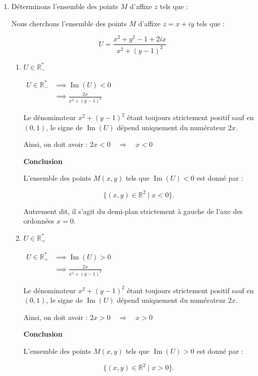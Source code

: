 \documentclass[12pt]{article}
\begin{document}
\begin{enumerate}
\item Déterminons l’ensemble des points $M$ d’affixe $z$ tels que :

Nous cherchons l’ensemble des points \( M \) d’affixe \( z = x + iy \) tels que :

\[
U = \frac{x^2 + y^2 - 1 + 2ix}{x^2 + (y-1)^2}
\]
    \begin{enumerate}
        \item $U \in \mathbb{R}^*_{-}$

$
\begin{aligned}
U \in \mathbb{R}^*_{-} &\implies  \operatorname{Im}(U) < 0\\
											 &\implies \frac{2x}{x^2 + (y-1)^2}
\end{aligned}
$

Le dénominateur \( x^2 + (y-1)^2 \) étant toujours strictement positif sauf en \( (0,1) \), le signe de \( \operatorname{Im}(U) \) dépend uniquement du numérateur \( 2x \).

Ainsi, on doit avoir : $2x < 0 \quad \Longrightarrow \quad x < 0$

\textbf{Conclusion}

L’ensemble des points \( M(x, y) \) tels que \( \operatorname{Im}(U) < 0 \) est donné par :

\[
\{ (x, y) \in \mathbb{R}^2 \mid x < 0 \}.
\]

Autrement dit, il s’agit du demi-plan strictement à gauche de l’axe des ordonnées \( x = 0 \).

        \item $U \in \mathbb{R}^*_{+}$
        
$
\begin{aligned}
U \in \mathbb{R}^*_{+} &\implies  \operatorname{Im}(U) > 0\\
											 &\implies \frac{2x}{x^2 + (y-1)^2}
\end{aligned}
$

Le dénominateur \( x^2 + (y-1)^2 \) étant toujours strictement positif sauf en \( (0,1) \), le signe de \( \operatorname{Im}(U) \) dépend uniquement du numérateur \( 2x \).

Ainsi, on doit avoir : $2x > 0 \quad \Longrightarrow \quad x > 0$

\textbf{Conclusion}

L’ensemble des points \( M(x, y) \) tels que \( \operatorname{Im}(U) > 0 \) est donné par :

\[
\{ (x, y) \in \mathbb{R}^2 \mid x > 0 \}.
\]


\end{enumerate}
\end{enumerate}
\end{document}
